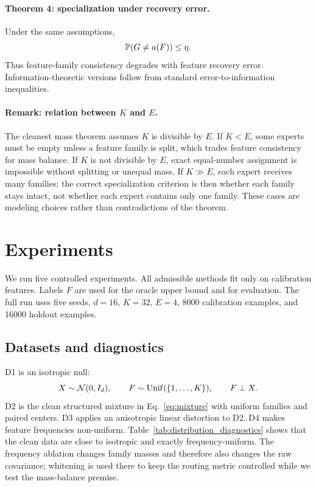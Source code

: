 \documentclass{article}
\begin{document}
\paragraph{Theorem 4: specialization under recovery error.}
Under the same assumptions,
\begin{equation}
    \mathbb{P}(G\neq a(F))\leq\eta.
\end{equation}
Thus feature-family consistency degrades with feature recovery error.
Information-theoretic versions follow from standard error-to-information
inequalities.

\paragraph{Remark: relation between \(K\) and \(E\).}
The cleanest mass theorem assumes \(K\) is divisible by \(E\).  If \(K<E\), some
experts must be empty unless a feature family is split, which trades feature
consistency for mass balance.  If \(K\) is not divisible by \(E\), exact
equal-number assignment is impossible without splitting or unequal mass.  If
\(K\gg E\), each expert receives many families; the correct specialization
criterion is then whether each family stays intact, not whether each expert
contains only one family.  These cases are modeling choices rather than
contradictions of the theorem.

\section{Experiments}

We run five controlled experiments.  All admissible methods fit only on
calibration features.  Labels \(F\) are used for the oracle upper bound and for
evaluation.  The full run uses five seeds, \(d=16\), \(K=32\), \(E=4\), 8000
calibration examples, and 16000 holdout examples.

\subsection{Datasets and diagnostics}

D1 is an isotropic null:
\[
    X\sim\mathcal{N}(0,I_d),\qquad
    F\sim\mathrm{Unif}(\{1,\ldots,K\}),\qquad F\perp X.
\]
D2 is the clean structured mixture in Eq.~\ref{eq:mixture} with uniform families
and paired centers.  D3 applies an anisotropic linear distortion to D2.  D4 makes
feature frequencies non-uniform.  Table~\ref{tab:distribution_diagnostics} shows
that the clean data are close to isotropic and exactly frequency-uniform.  The
frequency ablation changes family masses and therefore also changes the raw
covariance; whitening is used there to keep the routing metric controlled while
we test the mass-balance premise.
\end{document}
